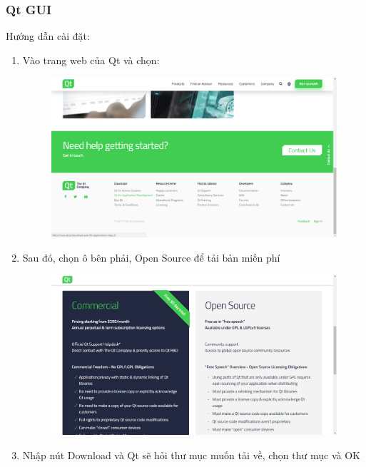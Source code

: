 \documentclass[12pt,a4paper]{report}
\begin{document}
            \subsubsection{Qt GUI}
            Hướng dẫn cài đặt:
            \begin{enumerate}
                \item Vào trang web của Qt và chọn:
                \begin{figure}[H]
                    \centering
                    \label{F:qtstep0}
                    \includegraphics[scale = .3]{Qtstep0.png}
                \end{figure}
                \item Sau đó, chọn ô bên phải, Open Source để tải bản miến phí
                \begin{figure}[H]
                    \centering
                    \label{F:qtstep1}
                    \includegraphics[scale = .3]{Qtstep1.png}
                \end{figure}
                \item Nhập nút Download và Qt sẽ hỏi thư mục muốn tải về, chọn thư mục và OK

\end{enumerate}
\end{document}
